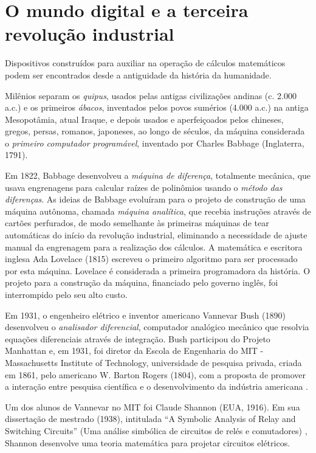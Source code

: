 \documentclass{hipatia}
\begin{document}
\section{O mundo digital e a terceira revolução industrial}


Dispositivos construídos para auxiliar na operação de cálculos matemáticos podem ser encontrados desde a antiguidade da história da humanidade.

Milênios separam os \textit{quipus}, usados pelas antigas civilizações andinas (c. 2.000 a.c.)  e os primeiros \textit{ábacos}, inventados pelos povos sumérios (4.000 a.c.) na antiga Mesopotâmia, atual Iraque, e depois usados e aperfeiçoados pelos chineses, gregos, persas, romanos, japoneses, ao longo de séculos, da máquina considerada o \textit{primeiro computador programável}, inventado por Charles Babbage (Inglaterra, 1791).

Em 1822, Babbage desenvolveu a \textit{máquina de diferença}, totalmente mecânica, que usava engrenagens para calcular raízes de polinômios usando o \textit{método das diferenças}. As ideias de Babbage evoluíram para o projeto de construção de uma máquina autônoma, chamada \textit{máquina analítica}, que recebia instruções através de cartões perfurados, de modo semelhante às primeiras máquinas de tear automáticas do início da revolução industrial, eliminando a necessidade de ajuste manual da engrenagem para a realização dos cálculos. A matemática e escritora inglesa Ada Lovelace (1815) escreveu o primeiro algoritmo para ser processado por esta máquina. Lovelace é considerada a primeira programadora da história. O projeto para a construção da máquina, financiado pelo governo inglês, foi interrompido pelo seu alto custo.

Em 1931, o engenheiro elétrico e inventor americano Vannevar Bush (1890) desenvolveu o \textit{analisador diferencial}, computador analógico mecânico que resolvia equações diferenciais através de integração. Bush participou do Projeto Manhattan e, em 1931, foi diretor da Escola de Engenharia do MIT - Massachusetts Institute of Technology, universidade de pesquisa privada, criada em 1861, pelo americano W. Barton Rogers (1804), com a proposta de promover a interação entre pesquisa científica e o desenvolvimento da indústria americana \cite{Ceruzzi2003}.

Um dos alunos de Vannevar no MIT foi Claude Shannon (EUA, 1916). Em sua dissertação de mestrado (1938), intitulada ``A Symbolic Analysis of Relay and Switching Circuits'' (Uma análise simbólica de circuitos de relés e comutadores) \cite{Shannon1938}, Shannon desenvolve uma teoria matemática para projetar circuitos elétricos.
\end{document}
